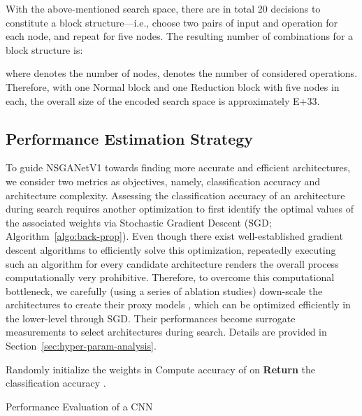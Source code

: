 \documentclass[journal]{IEEEtran}
\def\ourmethod{NSGANetV1}
\theoremstyle{definition}
\theoremstyle{remark}
\begin{document}
With the above-mentioned search space, there are in total 20 decisions to constitute a block structure---i.e., choose two pairs of input and operation for each node, and repeat for five nodes. The resulting number of combinations for a block structure is:

where  denotes the number of nodes,  denotes the number of considered operations. Therefore, with one Normal block and one Reduction block with five nodes in each, the overall size of the encoded search space is approximately \num{E+33}.

\vspace{-2mm}
\subsection{Performance Estimation Strategy}\label{sec:performance_estimation}
To guide \ourmethod{} towards finding more accurate and efficient architectures, we consider two metrics as objectives, namely, classification accuracy and architecture complexity. Assessing the classification accuracy of an architecture during search requires another optimization to first identify the optimal values of the associated weights via Stochastic Gradient Descent (SGD; Algorithm~\ref{algo:back-prop}). Even though there exist well-established gradient descent algorithms to efficiently solve this optimization, repeatedly executing such an algorithm for every candidate architecture renders the overall process computationally very prohibitive. {Therefore, to overcome this computational bottleneck, we carefully (using a series of ablation studies) down-scale the architectures to create their proxy models \cite{nasnet2018,real2019regularized}, which can be optimized efficiently in the lower-level through SGD. Their performances become surrogate measurements to select architectures during search. Details are provided in Section~\ref{sec:hyper-param-analysis}.}

\begin{algorithm}[t]
\SetAlgoLined
{}
\footnotesize
{}
  Randomly initialize the weights in \;
   Compute accuracy of  on \;
\textbf{Return} the classification accuracy .
 \caption{Performance Evaluation of a CNN\label{algo:back-prop}}
\end{algorithm}
\end{document}
